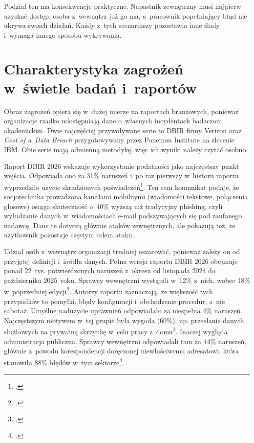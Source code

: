 \documentclass[12pt,a4paper]{article}
\begin{document}
Podział ten ma konsekwencje praktyczne. Napastnik zewnętrzny musi najpierw
uzyskać dostęp, osoba z~wewnątrz już go ma, a~pracownik popełniający błąd nie
ukrywa swoich działań. Każdy z~tych scenariuszy pozostawia inne ślady
i~wymaga innego sposobu wykrywania.

\section{Charakterystyka zagrożeń w~świetle badań i~raportów}

Obraz zagrożeń opiera się w~dużej mierze na raportach branżowych, ponieważ
organizacje rzadko udostępniają dane o~własnych incydentach badaczom
akademickim. Dwie najczęściej przywoływane serie to DBIR firmy Verizon oraz \emph{Cost of a~Data Breach}
przygotowywany przez Ponemon Institute na zlecenie IBM. Obie serie mają
odmienną metodykę, więc ich wyniki należy czytać osobno.

Raport DBIR 2026 wskazuje wykorzystanie podatności jako najczęstszy punkt
wejścia. Odpowiada ono za 31\% naruszeń i~po raz pierwszy w~historii raportu
wyprzedziło użycie skradzionych poświadczeń\footcite{verizon2026dbir}. Ten sam
komunikat podaje, że socjotechnika prowadzona kanałami mobilnymi (wiadomości
tekstowe, połączenia głosowe) osiąga skuteczność o~40\% wyższą niż tradycyjny
phishing, czyli wyłudzanie danych w~wiadomościach e-mail podszywających się
pod zaufanego nadawcę. Dane te dotyczą głównie ataków zewnętrznych, ale pokazują
też, że użytkownik pozostaje częstym celem ataku.

Udział osób z~wewnątrz organizacji trudniej oszacować, ponieważ zależy on od
przyjętej definicji i~źródła danych. Pełna wersja raportu DBIR 2026 obejmuje
ponad 22~tys. potwierdzonych naruszeń z~okresu od listopada 2024 do
października 2025~roku. Sprawcy wewnętrzni wystąpili w~12\% z~nich, wobec
18\% w~poprzedniej edycji\footcite[22]{verizon2026dbirraport}. Autorzy
raportu zaznaczają, że większość tych przypadków to pomyłki, błędy
konfiguracji i~obchodzenie procedur, a~nie sabotaż. Umyślne nadużycie
uprawnień odpowiadało za niespełna 4\% naruszeń. Najczęstszym motywem
w~tej grupie była wygoda (60\%), np. przesłanie danych służbowych na
prywatną skrzynkę w~celu pracy z~domu\footcite[57--58]{verizon2026dbirraport}.
Inaczej wygląda administracja publiczna. Sprawcy wewnętrzni odpowiadali tam
za 44\% naruszeń, głównie z~powodu korespondencji doręczonej niewłaściwemu
adresatowi, która stanowiła 88\% błędów w~tym
sektorze\footcite[89, 92]{verizon2026dbirraport}.
\end{document}
